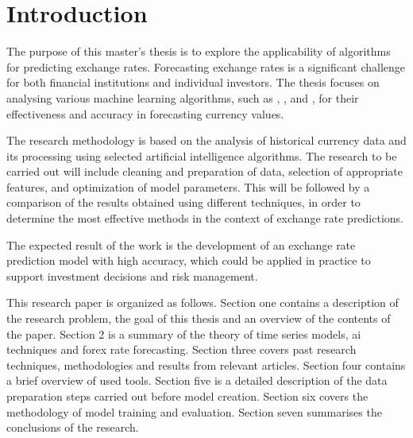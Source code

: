 \section{Introduction}\label{Introduction}

The purpose of this master's thesis is to explore the applicability of  algorithms for predicting exchange rates. Forecasting exchange rates is a significant challenge for both financial institutions and individual investors. The thesis focuses on analysing various machine learning algorithms, such as , , and , for their effectiveness and accuracy in forecasting currency values.

The research methodology is based on the analysis of historical currency data and its processing using selected artificial intelligence algorithms. The research to be carried out will include cleaning and preparation of data, selection of appropriate features, and optimization of model parameters. This will be followed by a comparison of the results obtained using different techniques, in order to determine the most effective methods in the context of exchange rate predictions.

The expected result of the work is the development of an exchange rate prediction model with high accuracy, which could be applied in practice to support investment decisions and risk management.

This research paper is organized as follows. Section one contains a description of the research problem, the goal of this thesis and an overview of the contents of the paper. Section 2 is a summary of the theory of time series models, \gls{ai} techniques and \gls{forex} rate forecasting. Section three covers past research techniques, methodologies and results from relevant articles. Section four contains a brief overview of used tools. Section five is a detailed description of the data preparation steps carried out before model creation. Section six covers the methodology of model training and evaluation. Section seven summarises the conclusions of the research.

